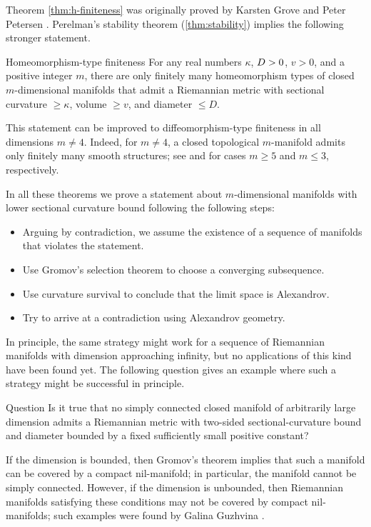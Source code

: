 Theorem \ref{thm:h-finiteness} was originally proved by Karsten Grove and Peter Petersen \cite{grove-petersen1988}.
Perelman's stability theorem (\ref{thm:stability}) implies the following stronger statement.

\begin{thm}{Homeomorphism-type finiteness}
For any real numbers $\kappa$, $D\z>0$, $v>0$, and a positive integer $m$, there are only finitely many homeomorphism types of closed $m$-dimensional manifolds that admit a Riemannian metric with sectional curvature $\ge \kappa$, volume $\ge v$, and diameter $\le D$.
\end{thm}

This statement can be improved to diffeomorphism-type finiteness in all dimensions $m\ne 4$.
Indeed, for $m\ne4$, a closed topological $m$-manifold admits only finitely many smooth structures; see \cite{kirby-siebenmann} and \cite{moise,thurston} for cases $m\ge 5$ and $m\le 3$, respectively.

In all these theorems we prove a statement about $m$-dimensional manifolds with lower sectional curvature bound following the following steps:
\begin{itemize}
\item Arguing by contradiction, we assume the existence of a sequence of manifolds that violates the statement.
\item Use Gromov's selection theorem to choose a converging subsequence.
\item Use curvature survival to conclude that the limit space is Alexandrov.
\item Try to arrive at a contradiction using Alexandrov geometry.
\end{itemize}

In principle, the same strategy might work for a sequence of Riemannian manifolds with dimension approaching infinity, but no applications of this kind have been found yet.
The following question gives an example where such a strategy might be successful in principle.

\begin{thm}{Question}
Is it true that no simply connected closed manifold of arbitrarily large dimension admits a Riemannian metric with two-sided sectional-curvature bound and diameter bounded by a fixed sufficiently small positive constant?
\end{thm}

If the dimension is bounded, then Gromov's theorem \cite{gromov1978} implies that such a manifold can be covered by a compact nil-manifold; in particular, the manifold cannot be simply connected.
However, if the dimension is unbounded, then Riemannian manifolds satisfying these conditions may not be covered by compact nil-manifolds; such examples were found by Galina Guzhvina \cite{guzhvina2008}.
